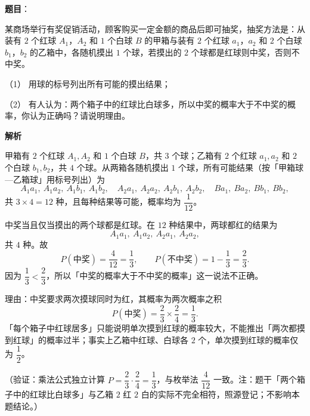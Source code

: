\begin{answer}

\textbf{题目}：

某商场举行有奖促销活动，顾客购买一定金额的商品后即可抽奖，抽奖方法是：从装有 \(2\) 个红球 \(A_1\)，\(A_2\) 和 \(1\) 个白球 \(B\) 的甲箱与装有 \(2\) 个红球 \(a_1\)，\(a_2\) 和 \(2\) 个白球 \(b_1\)，\(b_2\) 的乙箱中，各随机摸出 \(1\) 个球，若摸出的 \(2\) 个球都是红球则中奖，否则不中奖。

（1） 用球的标号列出所有可能的摸出结果；

（2） 有人认为：两个箱子中的红球比白球多，所以中奖的概率大于不中奖的概率，你认为正确吗？请说明理由。

\textbf{解析}


甲箱有 \(2\) 个红球 \(A_1,A_2\) 和 \(1\) 个白球 \(B\)，共 \(3\) 个球；乙箱有 \(2\) 个红球 \(a_1,a_2\) 和 \(2\) 个白球 \(b_1,b_2\)，共 \(4\) 个球。从两箱各随机摸出 \(1\) 个球，所有可能结果（按「甲箱球—乙箱球」用标号列出）为
\nopagebreak[4]
\[
A_1a_1,\ A_1a_2,\ A_1b_1,\ A_1b_2,\quad
A_2a_1,\ A_2a_2,\ A_2b_1,\ A_2b_2,\quad
Ba_1,\ Ba_2,\ Bb_1,\ Bb_2,
\]
共 \(3\times4=12\) 种，且每种结果等可能，概率均为 \(\dfrac1{12}\)。


中奖当且仅当摸出的两个球都是红球。在 \(12\) 种结果中，两球都红的结果为
\nopagebreak[4]
\[
A_1a_1,\ A_1a_2,\ A_2a_1,\ A_2a_2,
\]
共 \(4\) 种。故
\nopagebreak[4]
\[
P(\text{中奖})=\dfrac{4}{12}=\dfrac13,\qquad
P(\text{不中奖})=1-\dfrac13=\dfrac23.
\]
因为 \(\dfrac13<\dfrac23\)，所以「中奖的概率大于不中奖的概率」这一说法不正确。

理由：中奖要求两次摸球同时为红，其概率为两次概率之积
\nopagebreak[4]
\[
P(\text{中奖})=\dfrac23\times\dfrac24=\dfrac13.
\]
「每个箱子中红球居多」只能说明单次摸到红球的概率较大，不能推出「两次都摸到红球」的概率过半；事实上乙箱中红球、白球各 \(2\) 个，单次摸到红球的概率仅为 \(\dfrac12\)。

（验证：乘法公式独立计算 \(P=\dfrac23\cdot\dfrac24=\dfrac13\)，与枚举法 \(\dfrac4{12}\) 一致。注：题干「两个箱子中的红球比白球多」与乙箱 \(2\) 红 \(2\) 白的实际不完全相符，照源登记；不影响本题结论。）



\end{answer}
